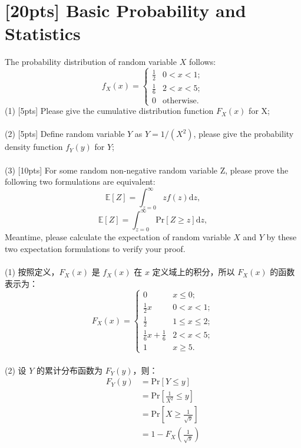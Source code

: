 \documentclass{article}
\begin{document}
	\section{[20pts] Basic Probability and Statistics}
	The probability distribution of random variable $X$ follows:\\
	\begin{equation}
	f_X(x)=\begin{cases}
	\frac{1}{2} & 0<x<1;\\
	\frac{1}{6} & 2<x<5;\\
	0 & \text{otherwise}.
	\end{cases}
	\end{equation} 
	(1) [5pts] Please give the cumulative distribution function $F_X(x)$ for X;\\ \\ 
	(2) [5pts] Define random variable $Y$ as $Y=1/(X^2)$, please give the probability density function $f_Y(y)$ for $Y$;\\ \\
	(3) [10pts] For some random non-negative random variable Z, please prove the following two formulations are equivalent:\\
	\begin{equation}
	\mathbb{E}[Z]=\int^\infty_{z=0} z f(z)\mathrm{d}z,
	\end{equation}
	\begin{equation}
	\mathbb{E}[Z]=\int^\infty_{z=0} \mathrm{Pr}[Z\geq z]\mathrm{d}z,
	\end{equation}
	Meantime, please calculate the expectation of random variable $X$ and $Y$ by these two expectation formulations to verify your proof.\\	\\
	(1) 按照定义，$F_X(x)$ 是 $f_X(x)$ 在 $x$ 定义域上的积分，所以 $F_X(x)$ 的函数表示为：\\
		\begin{equation}
		F_X(x)=\begin{cases}
		0 & x \leq 0; \\
		\frac{1}{2}x & 0<x<1;\\
		\frac{1}{2} & 1\leq x\leq 2;\\
		\frac{1}{6}x + \frac{1}{6} & 2<x<5;\\
		1 & x\geq 5.
		\end{cases}
		\end{equation} \\
	(2) 设 $Y$ 的累计分布函数为 $F_Y(y)$，则：
		\begin{equation}
		\begin{aligned}
		F_Y(y)
		&= \mathrm{Pr}[Y\leq y] \\
		&= \mathrm{Pr}[\frac{1}{X^2}\leq y] \\
		&= \mathrm{Pr}[X\geq \frac{1}{\sqrt{y}}] \\
		&= 1 - F_X(\frac{1}{\sqrt{y}})
		\end{aligned}
		\end{equation}
\end{document}

